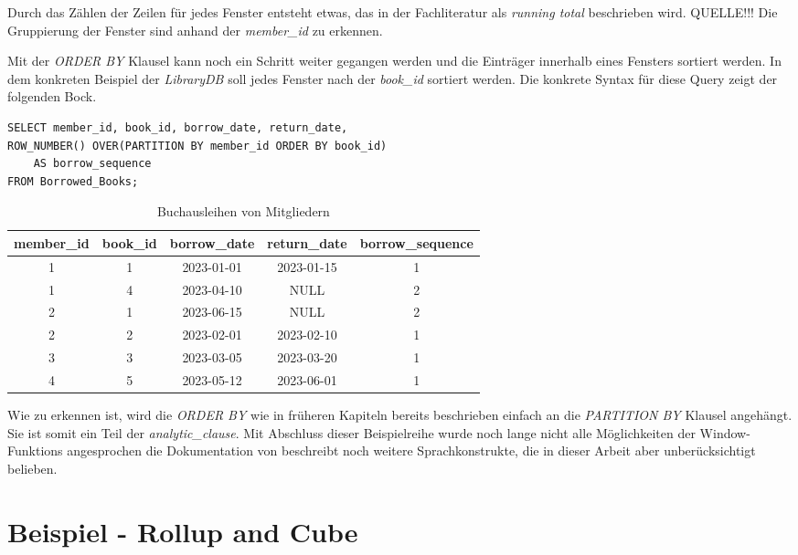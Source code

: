 Durch das Zählen der Zeilen für jedes Fenster entsteht etwas, das in der Fachliteratur
als \textit{running total} beschrieben wird. QUELLE!!! Die Gruppierung der
Fenster sind anhand der \textit{member\_id} zu erkennen.

Mit der \textit{ORDER BY} Klausel kann noch ein Schritt weiter gegangen werden
und die Einträger innerhalb eines Fensters sortiert werden. In dem konkreten Beispiel
der \textit{LibraryDB} soll jedes Fenster nach der \textit{book\_id} sortiert werden.
Die konkrete Syntax für diese Query zeigt der folgenden Bock.

\begin{lstlisting}
SELECT member_id, book_id, borrow_date, return_date,
ROW_NUMBER() OVER(PARTITION BY member_id ORDER BY book_id)
	AS borrow_sequence
FROM Borrowed_Books;
\end{lstlisting}
\begin{table}[h]
	\centering
	\begin{tabular}{|c|c|c|c|c|}
		\hline
		\textbf{member\_id} & \textbf{book\_id} & \textbf{borrow\_date} & \textbf{return\_date} & \textbf{borrow\_sequence} \\
		\hline
		1                   & 1                 & 2023-01-01            & 2023-01-15            & 1                         \\
		\hline
		1                   & 4                 & 2023-04-10            & NULL                  & 2                         \\
		\hline
		2                   & 1                 & 2023-06-15            & NULL                  & 2                         \\
		\hline
		2                   & 2                 & 2023-02-01            & 2023-02-10            & 1                         \\
		\hline
		3                   & 3                 & 2023-03-05            & 2023-03-20            & 1                         \\
		\hline
		4                   & 5                 & 2023-05-12            & 2023-06-01            & 1                         \\
		\hline
	\end{tabular}
	\caption{Buchausleihen von Mitgliedern}
	\label{tab:member_borrows}
\end{table}

Wie zu erkennen ist, wird die \textit{ORDER BY} wie in früheren Kapiteln bereits
beschrieben einfach an die \textit{PARTITION BY} Klausel angehängt. Sie ist somit
ein Teil der \textit{analytic\_clause}. Mit Abschluss dieser Beispielreihe wurde
noch lange nicht alle Möglichkeiten der Window-Funktions angesprochen die Dokumentation
von \citet{oracle} beschreibt noch weitere Sprachkonstrukte, die in dieser Arbeit
aber unberücksichtigt belieben.

\section{Beispiel - Rollup and Cube}